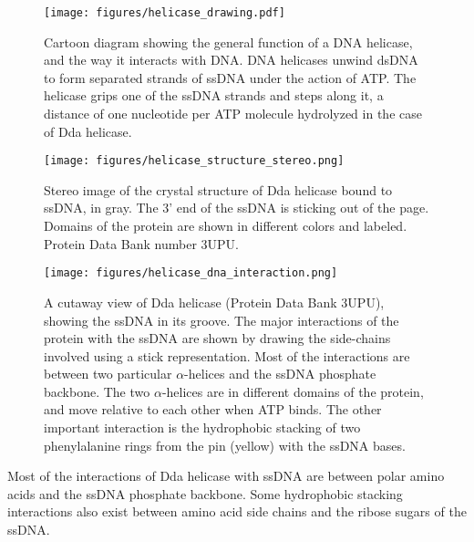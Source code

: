\begin{figure}[h]
\begin{centering}
\texttt{[image: figures/helicase\_drawing.pdf]}
\caption[DNA helicase general function]{Cartoon diagram showing the general function of a DNA helicase, and the way it interacts with DNA.  DNA helicases unwind dsDNA to form separated strands of ssDNA under the action of ATP.  The helicase grips one of the ssDNA strands and steps along it, a distance of one nucleotide per ATP molecule hydrolyzed in the case of Dda helicase.}
\label{fig:helicase_drawing}
\end{centering}
\end{figure}

\begin{figure}[h]
\begin{centering}
\texttt{[image: figures/helicase\_structure\_stereo.png]}
\caption[Dda helicase structure]{Stereo image of the crystal structure of Dda helicase bound to ssDNA, in gray.  The 3' end of the ssDNA is sticking out of the page.  Domains of the protein are shown in different colors and labeled.  Protein Data Bank number 3UPU. \citep{He2012}}
\label{fig:helicase_stereo}
\end{centering}
\end{figure}

\begin{figure}[h]
\begin{centering}
\texttt{[image: figures/helicase\_dna\_interaction.png]}
\caption[Dda helicase: interactions with ssDNA]{A cutaway view of Dda helicase (Protein Data Bank 3UPU), showing the ssDNA in its groove.  The major interactions of the protein with the ssDNA are shown by drawing the side-chains involved using a stick representation.  Most of the interactions are between two particular $\alpha$-helices and the ssDNA phosphate backbone.  The two $\alpha$-helices are in different domains of the protein, and move relative to each other when ATP binds.  The other important interaction is the hydrophobic stacking of two phenylalanine rings from the pin (yellow) with the ssDNA bases.}
\label{fig:helicase_ssDNA_interactions}
\end{centering}
\end{figure}

Most of the interactions of Dda helicase with ssDNA are between polar amino acids and the ssDNA phosphate backbone.  Some hydrophobic stacking interactions also exist between amino acid side chains and the ribose sugars of the ssDNA. \citep{He2012}

